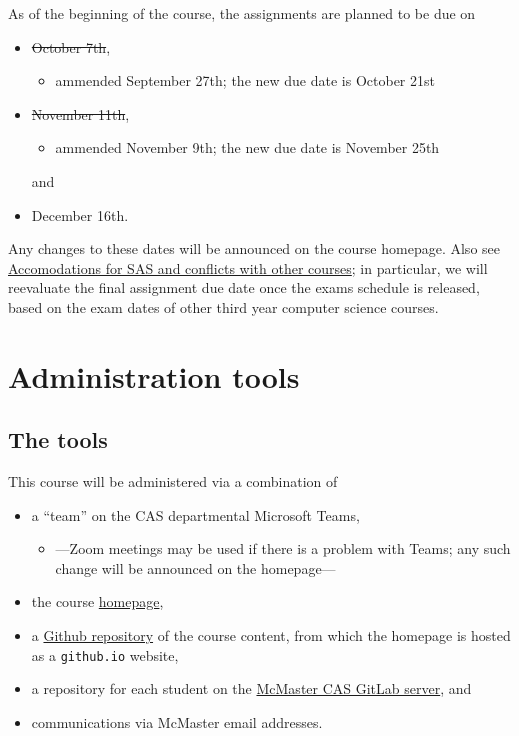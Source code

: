 \documentclass[11pt]{article}
\begin{document}
As of the beginning of the course,
the assignments are planned to be due on
\begin{itemize}
\item \sout{October 7th},
\begin{itemize}
\item ammended September 27th; the new due date is October 21st
\end{itemize}
\item \sout{November 11th},
\begin{itemize}
\item ammended November 9th; the new due date is November 25th
\end{itemize}
and
\item December 16th.
\end{itemize}

Any changes to these dates will be announced on the course homepage.
Also see \hyperref[sec:orge704d78]{Accomodations for SAS and conflicts with other courses};
in particular, we will reevaluate the final assignment due date
once the exams schedule is released, based on the exam dates
of other third year computer science courses.

\section{Administration tools}
\label{sec:orgddb752d}
\subsection{The tools}
\label{sec:org68500da}
This course will be administered via a combination of
\begin{itemize}
\item a “team” on the CAS departmental Microsoft Teams,
\begin{itemize}
\item —Zoom meetings may be used if there is a problem with Teams;
any such change will be announced on the homepage—
\end{itemize}
\item the course
\href{https://armkeh.github.io/principles-of-programming-languages/}{homepage},
\item a \href{https://github.com/armkeh/principles-of-programming-languages}{Github repository}
of the course content, from which
the homepage is hosted as a \texttt{github.io} website,
\item a repository for each student on the
\href{https://gitlab.cas.mcmaster.ca}{McMaster CAS GitLab server}, and
\item communications via McMaster email addresses.
\end{itemize}
\end{document}
